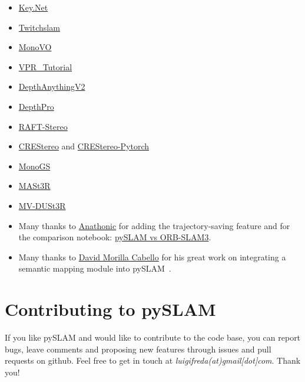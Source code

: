 \documentclass{article}
\begin{document}
\begin{itemize}
\item
  \href{https://github.com/axelBarroso/Key.Net}{Key.Net} \cite{barroso2020key}
\item
  \href{https://github.com/geohot/twitchslam}{Twitchslam} 
\item
  \href{https://github.com/uoip/monoVO-python}{MonoVO} 
\item
  \href{https://github.com/stschubert/VPR_Tutorial.git}{VPR\_Tutorial} \cite{VPR_Tutorial}
\item
  \href{https://github.com/DepthAnything/Depth-Anything-V2}{DepthAnythingV2} \cite{DepthAnythingV2}
\item
  \href{https://github.com/apple/ml-depth-pro}{DepthPro} \cite{depthpro2023}
\item
  \href{https://github.com/princeton-vl/RAFT-Stereo}{RAFT-Stereo} \cite{RAFTStereo}
\item
  \href{https://github.com/megvii-research/CREStereo}{CREStereo} and
  \href{https://github.com/ibaiGorordo/CREStereo-Pytorch}{CREStereo-Pytorch} \cite{CREStereo}
\item
  \href{https://github.com/muskie82/MonoGS}{MonoGS} \cite{MonoGS}
\item
  \href{https://github.com/naver/mast3r}{MASt3R} \cite{master}
\item
  \href{https://github.com/facebookresearch/mvdust3r}{MV-DUSt3R} \cite{mvduster}
\item
  Many thanks to \href{https://github.com/anathonic}{Anathonic} for
  adding the trajectory-saving feature and for the comparison notebook:
  \href{https://github.com/anathonic/Trajectory-Comparison-ORB-SLAM3-pySLAM/blob/main/trajectories_comparison.ipynb}{pySLAM vs ORB-SLAM3}.
\item 
	Many thanks to \href{https://github.com/dvdmc}{David Morilla Cabello} for his great work on integrating a semantic mapping module into pySLAM~\cite{pyslamSemantic2025}.
\end{itemize}


\hypertarget{contributing-to-pyslam}{%
\section{Contributing to pySLAM}\label{contributing-to-pyslam}}

If you like pySLAM and would like to contribute to the code base, you
can report bugs, leave comments and proposing new features through
issues and pull requests on github. Feel free to get in touch at
\emph{luigifreda(at)gmail{[}dot{]}com}. Thank you!





\end{document}
